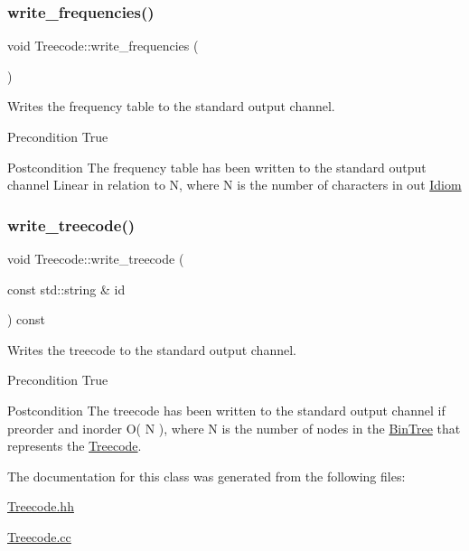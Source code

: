 \subsubsection{\texorpdfstring{write\+\_\+frequencies()}{write\_frequencies()}}
{\footnotesize\ttfamily void Treecode\+::write\+\_\+frequencies (\begin{DoxyParamCaption}{ }\end{DoxyParamCaption})}



Writes the frequency table to the standard output channel. 

\begin{DoxyPrecond}{Precondition}
True 
\end{DoxyPrecond}
\begin{DoxyPostcond}{Postcondition}
The frequency table has been written to the standard output channel  Linear in relation to N, where N is the number of characters in out \hyperlink{classIdiom}{Idiom} 
\end{DoxyPostcond}
\mbox{\label{classTreecode_aa2d4b5bb9f0c0dd4e4115498c6765b59}} 
\subsubsection{\texorpdfstring{write\+\_\+treecode()}{write\_treecode()}}
{\footnotesize\ttfamily void Treecode\+::write\+\_\+treecode (\begin{DoxyParamCaption}\item[{const std\+::string \&}]{id }\end{DoxyParamCaption}) const}



Writes the treecode to the standard output channel. 

\begin{DoxyPrecond}{Precondition}
True 
\end{DoxyPrecond}
\begin{DoxyPostcond}{Postcondition}
The treecode has been written to the standard output channel if preorder and inorder  O( N ), where N is the number of nodes in the \hyperlink{classBinTree}{Bin\+Tree} that represents the \hyperlink{classTreecode}{Treecode}. 
\end{DoxyPostcond}


The documentation for this class was generated from the following files\+:\begin{DoxyCompactItemize}
\item 
\hyperlink{Treecode_8hh}{Treecode.\+hh}\item 
\hyperlink{Treecode_8cc}{Treecode.\+cc}\end{DoxyCompactItemize}
